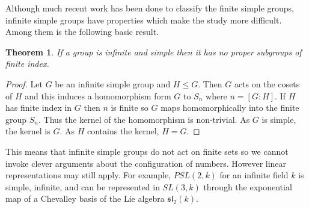 \documentclass[12pt]{article}
\newtheorem{thm}{Theorem}
\begin{document}
Although much recent work has been done to classify the finite simple groups, infinite simple groups have properties which make the study more difficult.  Among them is the following basic result.

\begin{thm}
If a group is infinite and simple then it has no proper subgroups of finite index.
\end{thm}
\begin{proof}
Let $G$ be an infinite simple group and $H\leq G$.  Then $G$ acts on the cosets of $H$ and this induces a homomorphism form $G$ to $S_n$ where $n=[G:H]$.  If $H$ has finite index in $G$ then $n$ is finite so $G$ maps homomorphically into the finite group $S_n$.  Thus the kernel of the homomorphism is non-trivial.  As $G$ is simple, the kernel is $G$.  As $H$ contains the kernel, $H=G$.
\end{proof}

This means that infinite simple groups do not act on finite sets so we cannot invoke clever arguments about the configuration of numbers.   However linear representations may still apply.  For example, $PSL(2,k)$ for an infinite field $k$ is simple, infinite, and can be represented in $SL(3,k)$ through the exponential map of a Chevalley basis of the Lie algebra $\mathfrak{sl}_2(k)$.

\end{document}
